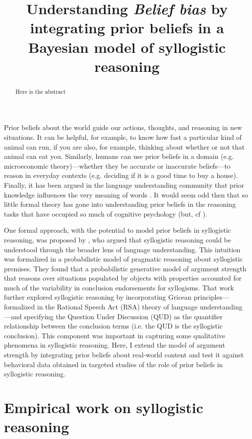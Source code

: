 \documentclass{llncs} %
\title{Understanding \emph{Belief bias} by integrating prior beliefs in a Bayesian model of syllogistic reasoning}
\begin{document}
\maketitle


\begin{abstract}
Here is the abstract
\end{abstract}

Prior beliefs about the world guide our actions, thoughts, and reasoning in new situations. It can be helpful, for example, to know how fast a particular kind of animal can run, if you are also, for example, thinking about whether or not that animal can eat you. Similarly, humans can use prior beliefs in a domain (e.g. microeconomic theory)---whether they be accurate or inaccurate beliefs---to reason in everyday contexts  (e.g. deciding if it is a good time to buy a house). Finally, it has been argued in the language understanding community that prior knowledge influences the very meaning of words \cite{LassGood2015}. It would seem odd then that so little formal theory has gone into understanding prior beliefs in the reasoning tasks that have occupied so much of cognitive psychology (but, cf ). 

One formal approach, with the potential to model prior beliefs in syllogistic reasoning, was proposed by , who argued that syllogistic reasoning could be understood through the broader lens of language understanding. This intuition was formalized in a probabilistic model of pragmatic reasoning about syllogistic premises. They found that a probabilistic generative model of argument strength that reasons over situations populated by objects with properties accounted for much of the variability in conclusion endorsements for syllogisms. That work further explored syllogistic reasoning by incorporating Gricean principles---formalized in the Rational Speech Act (RSA) theory of language understanding \cite{Frank2012,Goodman2013}---and specifying the Question Under Discussion \cite{Roberts2004} (QUD) as the quantifier relationship between the conclusion terms (i.e. the QUD is the syllogistic conclusion). This component was important in capturing some qualitative phenomena in syllogistic reasoning. Here, I extend the model of argument strength by integrating prior beliefs about real-world content and test it against behavioral data obtained in targeted studies of the role of prior beliefs in syllogistic reasoning.

\section{Empirical work on syllogistic reasoning}
\end{document}
